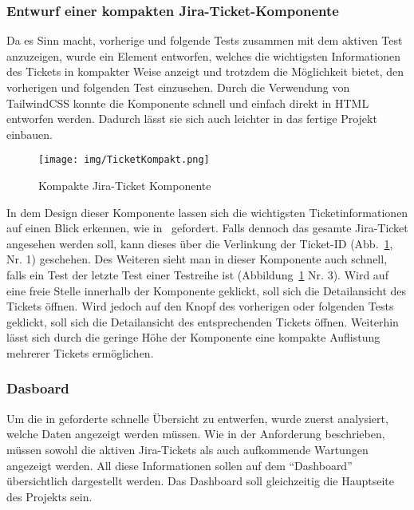 \newpage

\subsubsection{Entwurf einer kompakten Jira-Ticket-Komponente}\label{sec:jirakompakt}
Da es Sinn macht, vorherige und folgende Tests zusammen mit dem aktiven Test 
anzuzeigen, wurde ein Element entworfen, welches die wichtigsten Informationen 
des Tickets in kompakter Weise anzeigt und trotzdem die Möglichkeit bietet, den 
vorherigen und folgenden Test einzusehen.
Durch die Verwendung von TailwindCSS konnte die Komponente schnell und einfach 
direkt in \gls{HTML} entworfen werden. Dadurch lässt sie sich auch leichter in
das fertige Projekt einbauen.

\begin{figure}[H]
    \texttt{[image: img/TicketKompakt.png]}
    \caption{Kompakte Jira-Ticket Komponente}\label{fig:ticketcompact}
\end{figure}

In dem Design dieser Komponente lassen sich die wichtigsten Ticketinformationen
auf einen Blick erkennen, wie in~ gefordert. 
Falls dennoch das gesamte Jira-Ticket angesehen werden soll,
kann dieses über die Verlinkung der Ticket-ID (Abb.~\ref{fig:ticketcompact}, Nr. 1) 
geschehen. Des Weiteren sieht man in dieser Komponente auch schnell, falls ein 
Test der letzte Test einer Testreihe ist (Abbildung~\ref{fig:ticketcompact} Nr. 3).
Wird auf eine freie Stelle innerhalb der Komponente geklickt, soll sich die 
Detailansicht des Tickets öffnen. Wird jedoch auf 
den Knopf des vorherigen oder folgenden Tests geklickt, soll sich die Detailansicht des 
entsprechenden Tickets öffnen. Weiterhin lässt sich durch die geringe Höhe der 
Komponente eine kompakte Auflistung mehrerer Tickets ermöglichen.

\newpage 

\subsubsection{Dasboard}
Um die in  geforderte schnelle Übersicht zu entwerfen, 
wurde zuerst analysiert, welche Daten angezeigt werden müssen. Wie in der 
Anforderung  beschrieben, müssen sowohl die aktiven Jira-Tickets als auch 
aufkommende Wartungen angezeigt werden. All diese Informationen sollen auf dem 
``Dashboard'' übersichtlich dargestellt werden. Das Dashboard soll gleichzeitig
die Hauptseite des Projekts sein.


